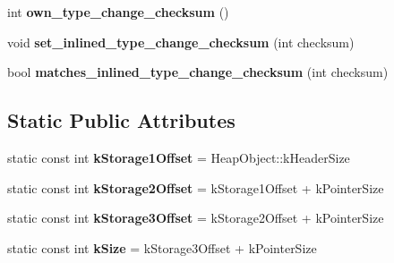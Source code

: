 \begin{DoxyCompactItemize}
\item 
int {\bfseries own\+\_\+type\+\_\+change\+\_\+checksum} ()\hypertarget{classv8_1_1internal_1_1_type_feedback_info_ad1d4300cf4aee1e342bb68af998ffb75}{}\label{classv8_1_1internal_1_1_type_feedback_info_ad1d4300cf4aee1e342bb68af998ffb75}

\item 
void {\bfseries set\+\_\+inlined\+\_\+type\+\_\+change\+\_\+checksum} (int checksum)\hypertarget{classv8_1_1internal_1_1_type_feedback_info_ac8009b957b466a51bd9ad3d979b9c852}{}\label{classv8_1_1internal_1_1_type_feedback_info_ac8009b957b466a51bd9ad3d979b9c852}

\item 
bool {\bfseries matches\+\_\+inlined\+\_\+type\+\_\+change\+\_\+checksum} (int checksum)\hypertarget{classv8_1_1internal_1_1_type_feedback_info_a18b211dd8b3707184c63808439a48d71}{}\label{classv8_1_1internal_1_1_type_feedback_info_a18b211dd8b3707184c63808439a48d71}

\end{DoxyCompactItemize}
\subsection*{Static Public Attributes}
\begin{DoxyCompactItemize}
\item 
static const int {\bfseries k\+Storage1\+Offset} = Heap\+Object\+::k\+Header\+Size\hypertarget{classv8_1_1internal_1_1_type_feedback_info_a60514fdc6640adb4ef1a318f1e77b144}{}\label{classv8_1_1internal_1_1_type_feedback_info_a60514fdc6640adb4ef1a318f1e77b144}

\item 
static const int {\bfseries k\+Storage2\+Offset} = k\+Storage1\+Offset + k\+Pointer\+Size\hypertarget{classv8_1_1internal_1_1_type_feedback_info_a018effc7aa365f49af3b1eb1838ac635}{}\label{classv8_1_1internal_1_1_type_feedback_info_a018effc7aa365f49af3b1eb1838ac635}

\item 
static const int {\bfseries k\+Storage3\+Offset} = k\+Storage2\+Offset + k\+Pointer\+Size\hypertarget{classv8_1_1internal_1_1_type_feedback_info_a05da822d50314943ada1463d10986567}{}\label{classv8_1_1internal_1_1_type_feedback_info_a05da822d50314943ada1463d10986567}

\item 
static const int {\bfseries k\+Size} = k\+Storage3\+Offset + k\+Pointer\+Size\hypertarget{classv8_1_1internal_1_1_type_feedback_info_ace41df54997c2e68abc74b33d39fb4d5}{}\label{classv8_1_1internal_1_1_type_feedback_info_ace41df54997c2e68abc74b33d39fb4d5}

\end{DoxyCompactItemize}

